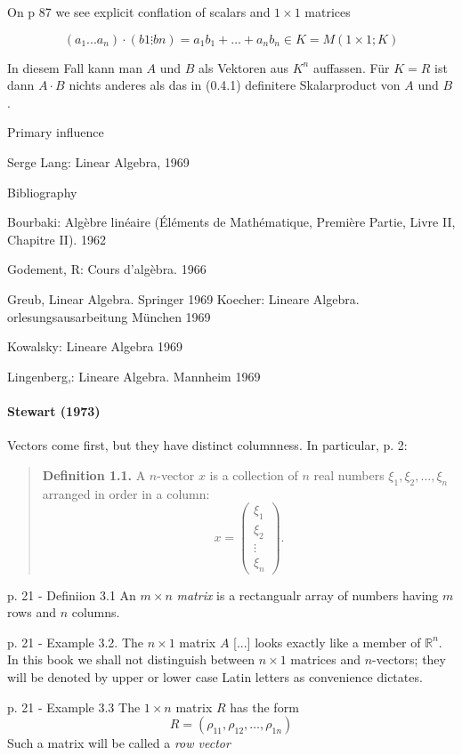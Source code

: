 On p 87 we see explicit conflation of scalars and $1\times1$ matrices

\[
(a_1...a_n) \cdot (b1 \vdots bn) = a_1 b_1 + \dots + a_n b_n \in K = M(1\times 1; K)\]

In diesem Fall kann man $A$ und $B$ als Vektoren aus $K^n$ auffassen. Für $K=R$ ist dann $A\cdot B$ nichts anderes als das in (0.4.1) definitere Skalarproduct von $A$ und $B$.

Primary influence

Serge Lang: Linear Algebra, 1969

Bibliography

Bourbaki: Algèbre linéaire (Éléments de Mathématique, Première Partie, Livre II, Chapitre II). 1962

Godement, R: Cours d'algèbra. 1966

Greub, Linear Algebra. Springer 1969
Koecher: Lineare Algebra. orlesungsausarbeitung München 1969

Kowalsky: Lineare Algebra 1969

Lingenberg,: Lineare Algebra. Mannheim 1969


\paragraph{Stewart (1973)~\cite{Stewart1973}}

Vectors come first, but they have distinct columnness. In particular, p. 2:

\begin{quote}
    \textbf{Definition 1.1.} A $n$-vector $x$ is a collection of $n$ real numbers
    $\xi_1, \xi_2, \dots, \xi_n$ arranged in order in a column:
    \[
        x = \begin{pmatrix}\xi_1\\\xi_2\\\vdots\\\xi_n\end{pmatrix}.
    \]
\end{quote}

p. 21 - Definiion 3.1 An $m\times n$ \textit{matrix} is a rectangualr array of numbers
having $m$ rows and $n$ columns.

p. 21 - Example 3.2. The $n\times1$ matrix $A$ [...] looks exactly like a member of $\mathbb R^n$. In this book
we shall not distinguish between $n\times1$ matrices and $n$-vectors; they will be denoted by
upper or lower case Latin letters as convenience dictates.

p. 21 - Example 3.3 The $1\times n$ matrix $R$ has the form
\[
    R = (\rho_{11},\rho_{12},\dots,\rho_{1n})
\]
Such a matrix will be called a \textit{row vector}

